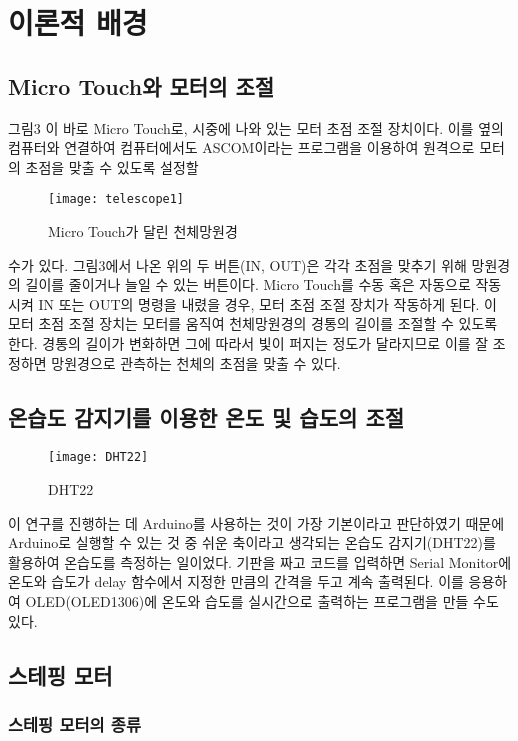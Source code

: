 \section{이론적 배경}

\subsection{Micro Touch와 모터의 조절}

그림3 이 바로 Micro Touch로, 시중에 나와 있는 모터 초점 조절 장치이다. 이를 옆의 컴퓨터와 연결하여 컴퓨터에서도 ASCOM이라는 프로그램을 이용하여 원격으로 모터의 초점을 맞출 수 있도록 설정할 
\begin{wrapfigure}{l}{0.25\textwidth}
	\texttt{[image: telescope1]}
	\caption{Micro Touch가 달린 천체망원경}
	\label{fig:telescope1}
\end{wrapfigure}
수가 있다. 그림3에서 나온 위의 두 버튼(IN, OUT)은 각각 초점을 맞추기 위해 망원경의 길이를 줄이거나 늘일 수 있는 버튼이다. Micro Touch를 수동 혹은 자동으로 작동시켜 IN 또는 OUT의 명령을 내렸을 경우, 모터 초점 조절 장치가 작동하게 된다. 이 모터 초점 조절 장치는 모터를 움직여 천체망원경의 경통의 길이를 조절할 수 있도록 한다. 경통의 길이가 변화하면 그에 따라서 빛이 퍼지는 정도가 달라지므로 이를 잘 조정하면 망원경으로 관측하는 천체의 초점을 맞출 수 있다.

\subsection{온습도 감지기를 이용한 온도 및 습도의 조절}

\begin{wrapfigure}{l}{0.05\textwidth}
	\texttt{[image: DHT22]}
	\caption{DHT22}
	\label{fig:DHT22}
\end{wrapfigure}
이 연구를 진행하는 데 Arduino를 사용하는 것이 가장 기본이라고 판단하였기 때문에 Arduino로 실행할 수 있는 것 중 쉬운 축이라고 생각되는 온습도 감지기(DHT22)를 활용하여 온습도를 측정하는 일이었다. 기판을 짜고 코드를 입력하면 Serial Monitor에 온도와 습도가 delay 함수에서 지정한 만큼의 간격을 두고 계속 출력된다. 이를 응용하여 OLED(OLED1306)에 온도와 습도를 실시간으로 출력하는 프로그램을 만들 수도 있다.

\subsection{스테핑 모터}

\subsubsection{스테핑 모터의 종류}

